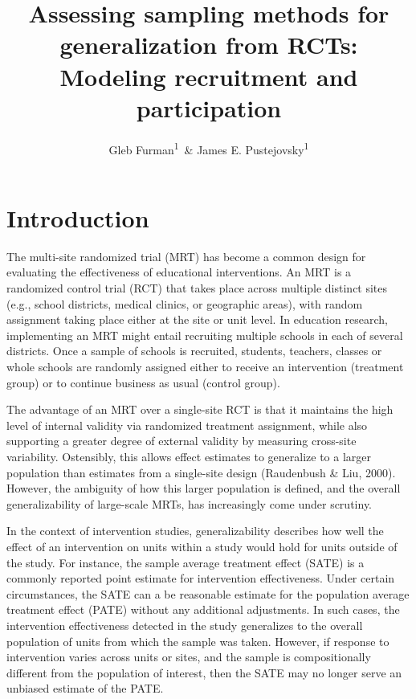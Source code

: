 \documentclass[man,floatsintext]{apa6}
\affiliation{
\vspace{0.5cm}
\textsuperscript{1} University of Texas at Austin}
\title{Assessing sampling methods for generalization from RCTs: Modeling recruitment and participation}
\author{Gleb Furman\textsuperscript{1}~\& James E. Pustejovsky\textsuperscript{1}}
\date{}
\begin{document}
\maketitle

\hypertarget{introduction}{%
\section{Introduction}\label{introduction}}

The multi-site randomized trial (MRT) has become a common design for evaluating the effectiveness of educational interventions. An MRT is a randomized control trial (RCT) that takes place across multiple distinct sites (e.g., school districts, medical clinics, or geographic areas), with random assignment taking place either at the site or unit level. In education research, implementing an MRT might entail recruiting multiple schools in each of several districts. Once a sample of schools is recruited, students, teachers, classes or whole schools are randomly assigned either to receive an intervention (treatment group) or to continue business as usual (control group).

The advantage of an MRT over a single-site RCT is that it maintains the high level of internal validity via randomized treatment assignment, while also supporting a greater degree of external validity by measuring cross-site variability. Ostensibly, this allows effect estimates to generalize to a larger population than estimates from a single-site design (Raudenbush \& Liu, 2000). However, the ambiguity of how this larger population is defined, and the overall generalizability of large-scale MRTs, has increasingly come under scrutiny.

In the context of intervention studies, generalizability describes how well the effect of an intervention on units within a study would hold for units outside of the study. For instance, the sample average treatment effect (SATE) is a commonly reported point estimate for intervention effectiveness. Under certain circumstances, the SATE can a be reasonable estimate for the population average treatment effect (PATE) without any additional adjustments. In such cases, the intervention effectiveness detected in the study generalizes to the overall population of units from which the sample was taken. However, if response to intervention varies across units or sites, and the sample is compositionally different from the population of interest, then the SATE may no longer serve an unbiased estimate of the PATE.
\end{document}
